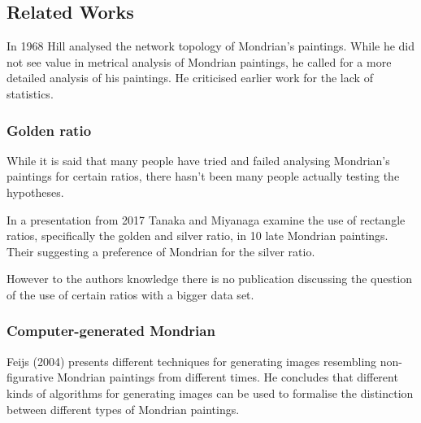 \subsection{Related Works}


In 1968 Hill \cite{Hill1968} analysed the network topology of Mondrian's paintings.
While he did not see value in metrical analysis of Mondrian paintings, he called
for a more detailed analysis of his paintings. He criticised earlier work for
the lack of statistics.

\subsubsection{Golden ratio}

\cite{Livio2002}

While it is said that many people have tried and failed analysing Mondrian's
paintings for certain ratios, there hasn't been many people actually testing
the hypotheses.

In a presentation from 2017 Tanaka and Miyanaga \cite{Tanaka2017} examine the use
of rectangle ratios, specifically the golden and silver ratio, in 10 late
Mondrian paintings. Their suggesting a preference of Mondrian for the silver
ratio.

However to the authors knowledge there is no publication discussing the question of
the use of certain ratios with a bigger data set.

\subsubsection{Computer-generated Mondrian}



Feijs (2004)\cite{Feijs2004} presents different techniques for generating images
resembling non-figurative Mondrian paintings from different times. He  concludes
that different kinds of algorithms for generating images can be used to
formalise the distinction between different types of Mondrian paintings.

